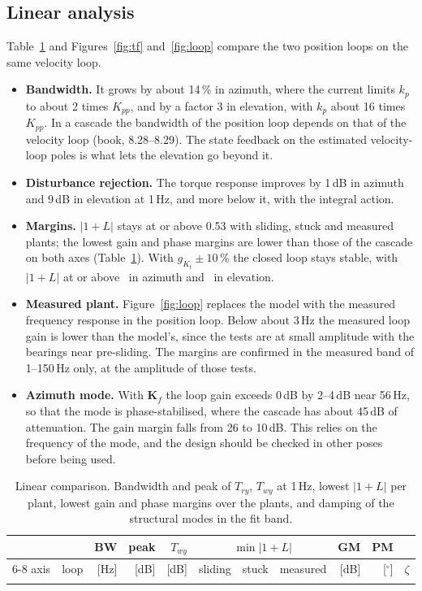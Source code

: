 \documentclass[10pt,a4paper]{article}
\numberwithin{equation}{section}
\begin{document}
\subsection{Linear analysis}
Table~\ref{tab:linear} and Figures~\ref{fig:tf} and~\ref{fig:loop} compare the two position loops on the same velocity loop.
\begin{itemize}
\item \textbf{Bandwidth.} It grows by about 14\,\% in azimuth, where the current limits $k_p$ to about 2 times $K_{pp}$, and by a factor 3 in elevation, with $k_p$ about 16 times $K_{pp}$. In a cascade the bandwidth of the position loop depends on that of the velocity loop (book, 8.28--8.29). The state feedback on the estimated velocity-loop poles is what lets the elevation go beyond it.
\item \textbf{Disturbance rejection.} The torque response improves by 1\,dB in azimuth and 9\,dB in elevation at 1\,Hz, and more below it, with the integral action.
\item \textbf{Margins.} $|1+L|$ stays at or above 0.53 with sliding, stuck and measured plants; the lowest gain and phase margins are lower than those of the cascade on both axes (Table~\ref{tab:linear}). With $g_{K_t}\pm10\,\%$ the closed loop stays stable, with $|1+L|$ at or above \robModA\ in azimuth and \robModP\ in elevation.
\item \textbf{Measured plant.} Figure~\ref{fig:loop} replaces the model with the measured frequency response in the position loop. Below about 3\,Hz the measured loop gain is lower than the model's, since the tests are at small amplitude with the bearings near pre-sliding. The margins are confirmed in the measured band of 1--150\,Hz only, at the amplitude of those tests.
\item \textbf{Azimuth mode.} With $\mathbf K_f$ the loop gain exceeds 0\,dB by 2--4\,dB near 56\,Hz, so that the mode is phase-stabilised, where the cascade has about 45\,dB of attenuation. The gain margin falls from 26 to 10\,dB. This relies on the frequency of the mode, and the design should be checked in other poses before being used.
\end{itemize}

\begin{table}[H]\centering\footnotesize\setlength{\tabcolsep}{3pt}
\caption{Linear comparison. Bandwidth and peak of $T_{ry}$, $T_{wy}$ at 1\,Hz, lowest $|1+L|$ per plant, lowest gain and phase margins over the plants, and damping of the structural modes in the fit band.}\label{tab:linear}
\begin{tabular}{llrrrrrrrrl}\toprule
& & BW & peak & $T_{wy}$ & \multicolumn{3}{c}{$\min|1+L|$} & GM & PM & \\
\cmidrule(lr){6-8}
axis & loop & [Hz] & [dB] & [dB] & sliding & stuck & measured & [dB] & [$^\circ$] & $\zeta$ \\ \midrule
\\ \bottomrule
\end{tabular}\end{table}
\end{document}
